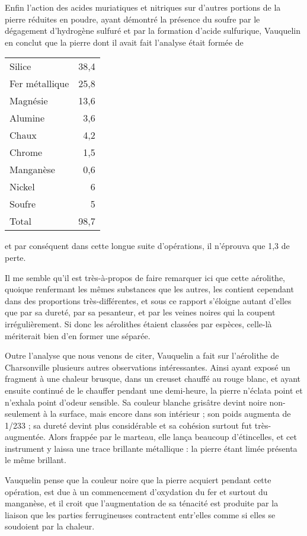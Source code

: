 \documentclass[a4paper, 12pt, oneside, french]{article}
\begin{document}
Enfin l'action des acides muriatiques et nitriques sur d'autres portions de la pierre réduites en poudre, ayant démontré la présence du soufre par le dégagement d'hydrogène sulfuré et par la formation d'acide sulfurique, Vauquelin en conclut que la pierre dont il avait fait l'analyse était formée de
\begin{table}[H]
    \centering
    \begin{tabular}{l r}
        Silice & 38,4 \\
        Fer métallique & 25,8 \\
        Magnésie & 13,6 \\
        Alumine & 3,6 \\
        Chaux & 4,2 \\
        Chrome & 1,5 \\
        Manganèse & 0,6 \\
        Nickel & 6 \\
        Soufre & 5 \\ \hline
        Total & 98,7 \\
    \end{tabular}
\end{table}
et par conséquent dans cette longue suite d'opérations, il n'éprouva que 1,3 de perte.

Il me semble qu'il est très-à-propos de faire remarquer ici que cette aérolithe, quoique renfermant les mêmes substances que les autres, les contient cependant dans des proportions très-différentes, et sous ce rapport s'éloigne autant d'elles que par sa dureté, par sa pesanteur, et par les veines noires qui la coupent irrégulièrement. Si donc les aérolithes étaient classées par espèces, celle-là mériterait bien d'en former une séparée.

Outre l'analyse que nous venons de citer, Vauquelin a fait sur l'aérolithe de Charsonville plusieurs autres observations intéressantes. Ainsi ayant exposé un fragment à une chaleur brusque, dans un creuset chauffé au rouge blanc, et ayant ensuite continué de le chauffer pendant une demi-heure, la pierre n'éclata point et n'exhala point d'odeur sensible. Sa couleur blanche grisâtre devint noire non-seulement à la surface, mais encore dans son intérieur ; son poids augmenta de 1/233 ; sa dureté devint plus considérable et sa cohésion surtout fut très-augmentée. Alors frappée par le marteau, elle lança beaucoup d'étincelles, et cet instrument y laissa une trace brillante métallique : la pierre étant limée présenta le même brillant.

Vauquelin pense que la couleur noire que la pierre acquiert pendant cette opération, est due à un commencement d'oxydation du fer et surtout du manganèse, et il croit que l'augmentation de sa ténacité est produite par la liaison que les parties ferrugineuses contractent entr'elles comme si elles se soudoient par la chaleur.
\end{document}
